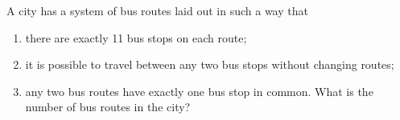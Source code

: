 \documentclass{pset}
\begin{document}
\begin{problems}
\begin{problem}[IrMO 1988 Q15]
    A city has a system of bus routes laid out in such a way that
    \begin{enumerate}
        \item there are exactly 11 bus stops on each route;
        \item it is possible to travel between any two bus stops without changing routes;
        \item any two bus routes have exactly one bus stop in common.
        What is the number of bus routes in the city?
    \end{enumerate}
\end{problem}







\end{problems}
\end{document}
